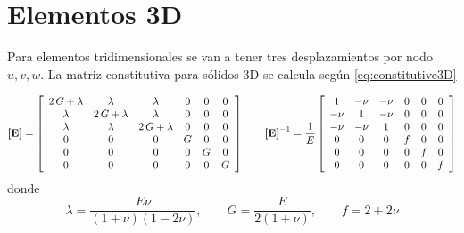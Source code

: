 
\chapter{Elementos 3D}
Para elementos tridimensionales se van a tener tres desplazamientos por nodo $u,v,w$. La matriz constitutiva para sólidos 3D se calcula según \eqref{eq:constitutive3D}

\begin{equation} \label{eq:constitutive3D}
\boldsymbol{[}\mathbf{E} \boldsymbol{]} =\left[\begin{array}{cccccc} 2\,G+\lambda  & \lambda  & \lambda  & 0 & 0 & 0\\ \lambda  & 2\,G+\lambda  & \lambda  & 0 & 0 & 0\\ \lambda  & \lambda  & 2\,G+\lambda  & 0 & 0 & 0\\ 0 & 0 & 0 & G & 0 & 0\\ 0 & 0 & 0 & 0 & G & 0\\ 0 & 0 & 0 & 0 & 0 & G \end{array}\right] \qquad \boldsymbol{[}\mathbf{E} \boldsymbol{]}^{-1}=\frac{1}{E}\left[\begin{array}{cccccc} 1 & -\nu  & -\nu  & 0 & 0 & 0\\ -\nu  & 1 & -\nu  & 0 & 0 & 0\\ -\nu  & -\nu  & 1 & 0 & 0 & 0\\ 0 & 0 & 0 & f & 0 & 0\\ 0 & 0 & 0 & 0 & f & 0\\ 0 & 0 & 0 & 0 & 0 & f \end{array}\right]
\end{equation}
donde 
\[
\lambda = \frac{E \nu}{(1+\nu)(1-2\nu)}, \qquad  G=\frac{E}{2(1+\nu)}, \qquad f = 2+2\nu
\]

